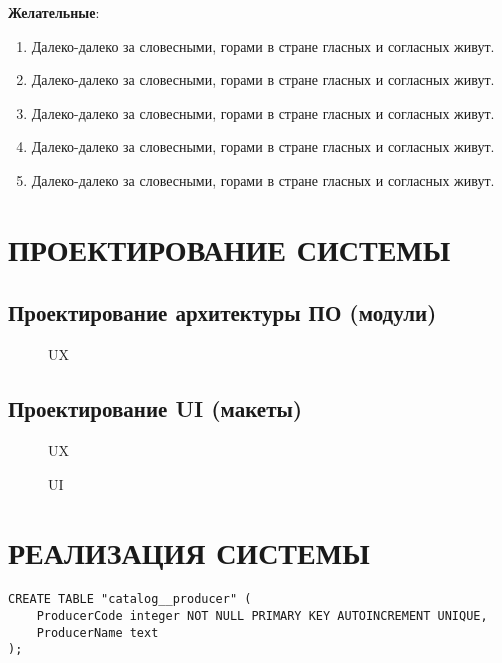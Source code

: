 \documentclass[
    12pt, %
    a4paper, %
    simple, %
    floatsection %
]{eskdtext}
\begin{document}
\textbf{Желательные}:
\begin{enumerate}
    \item Далеко-далеко за словесными, горами в стране гласных и согласных живут.
    \item Далеко-далеко за словесными, горами в стране гласных и согласных живут.
    \item Далеко-далеко за словесными, горами в стране гласных и согласных живут.
    \item Далеко-далеко за словесными, горами в стране гласных и согласных живут.
    \item Далеко-далеко за словесными, горами в стране гласных и согласных живут.
\end{enumerate}


\newpage
\section{ПРОЕКТИРОВАНИЕ СИСТЕМЫ}

\subsection{Проектирование архитектуры ПО (модули)}

\begin{figure}[!h]
    \centering
    \caption{UX}
\end{figure}

\subsection{Проектирование UI (макеты)}

\begin{figure}[!h]
    \centering
    \caption{UX}
\end{figure}

\begin{figure}[!h]
    \centering
    \caption{UI}
\end{figure}

\newpage
\section{РЕАЛИЗАЦИЯ СИСТЕМЫ}

\begin{lstlisting}[name=Справочник "Производители"]
CREATE TABLE "catalog__producer" (
    ProducerCode integer NOT NULL PRIMARY KEY AUTOINCREMENT UNIQUE,
    ProducerName text
);
\end{lstlisting}
\end{document}
